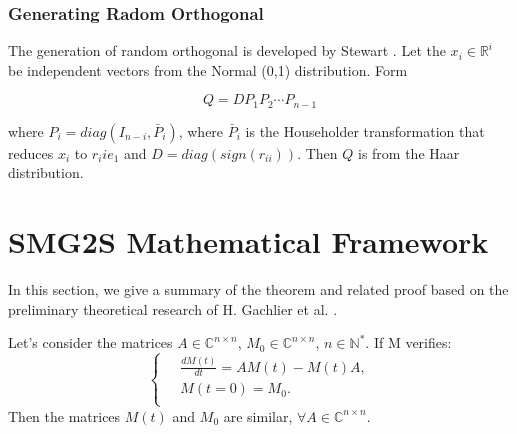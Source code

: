 \subsubsection{Generating Radom Orthogonal}

The generation of random orthogonal is developed by Stewart \cite{stewart1980efficient}. Let the $x_i \in \mathbb{R}^i$ be independent vectors from the Normal (0,1) distribution. Form 

\begin{equation}
Q=DP_1P_2\cdots P_{n-1}
\end{equation}

where $P_i=diag(I_{n-i},\bar{P}_i)$, where $\bar{P}_i$ is the Householder transformation that reduces $x_i$ to $r_iie_1$ and $D=diag(sign(r_{ii}))$. Then $Q$ is from the Haar distribution.
\fi

\section{SMG2S Mathematical Framework}\label{Mathematical Framework}

In this section, we give a summary of the theorem and related proof based on the preliminary theoretical research of H. Gachlier et al. \cite{galichergenerate}.


\begin{theorem}
	\label{theo1}
	Let's consider the matrices $A \in \mathbb{C}^{n \times n}$, $M_0  \in \mathbb{C}^{n \times n}$, $n \in \mathbb{N}^*$. If M verifies: 
	\[
	\left\{\
	\begin{aligned}
	&\frac{dM(t)}{dt} = AM(t) - M(t)A, \\
	&M(t=0) = M_0. \\ 
	\end{aligned}
	\right.
	\]
	Then the matrices $M(t)$ and $M_0$ are similar, $\forall A \in \mathbb{C}^{n \times n}$. 
\end{theorem}

